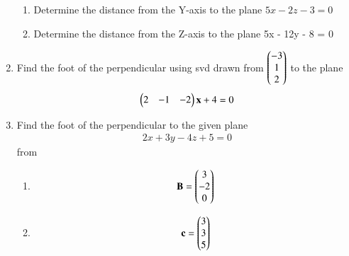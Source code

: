 \begin{enumerate}[label=\thesubsection.\arabic*.,ref=\thesubsection.\theenumi]
\begin{enumerate}
\end{enumerate}
\begin{enumerate}
\item Determine the distance from the Y-axis to the plane $5x - 2z - 3 = 0$
%
\\
\solution

\item Determine the distance from the Z-axis to the plane 5x - 12y - 8 = 0
%
\\
\solution


\end{enumerate}

\item Find the foot of the perpendicular using svd drawn from $\begin{pmatrix}-3\\1\\2\end{pmatrix}$ to the plane
 \begin{align}
 \begin{pmatrix}2&-1&-2\end{pmatrix}\mathbf{x}+4=0
 \end{align}
%
\solution

\item Find the foot of the perpendicular 
to the given plane
\begin{align}
2x+3y-4z+5=0 
\end{align}
from
\begin{enumerate}
\item 
\begin{align}
\mathbf{B}=\begin{pmatrix}3\\-2\\0\end{pmatrix}
\end{align}
%
\solution

%
\item 
\begin{align}
\mathbf{c}=\begin{pmatrix}3\\3\\5\end{pmatrix}
\end{align}
\solution

\end{enumerate}
\end{enumerate}



